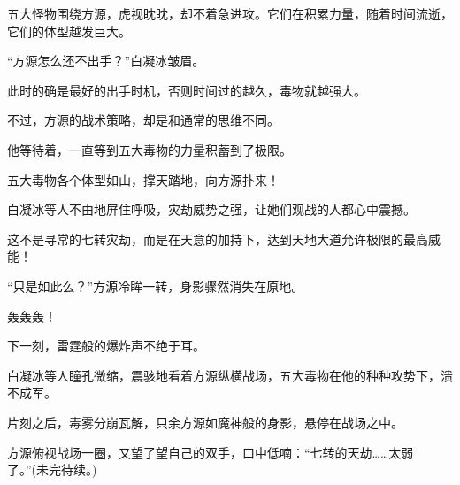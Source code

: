 \begin{this_body}
五大怪物围绕方源，虎视眈眈，却不着急进攻。它们在积累力量，随着时间流逝，它们的体型越发巨大。

“方源怎么还不出手？”白凝冰皱眉。

此时的确是最好的出手时机，否则时间过的越久，毒物就越强大。

不过，方源的战术策略，却是和通常的思维不同。

他等待着，一直等到五大毒物的力量积蓄到了极限。

五大毒物各个体型如山，撑天踏地，向方源扑来！

白凝冰等人不由地屏住呼吸，灾劫威势之强，让她们观战的人都心中震撼。

这不是寻常的七转灾劫，而是在天意的加持下，达到天地大道允许极限的最高威能！

“只是如此么？”方源冷眸一转，身影骤然消失在原地。

轰轰轰！

下一刻，雷霆般的爆炸声不绝于耳。

白凝冰等人瞳孔微缩，震骇地看着方源纵横战场，五大毒物在他的种种攻势下，溃不成军。

片刻之后，毒雾分崩瓦解，只余方源如魔神般的身影，悬停在战场之中。

方源俯视战场一圈，又望了望自己的双手，口中低喃：“七转的天劫……太弱了。”(未完待续。)

\end{this_body}

